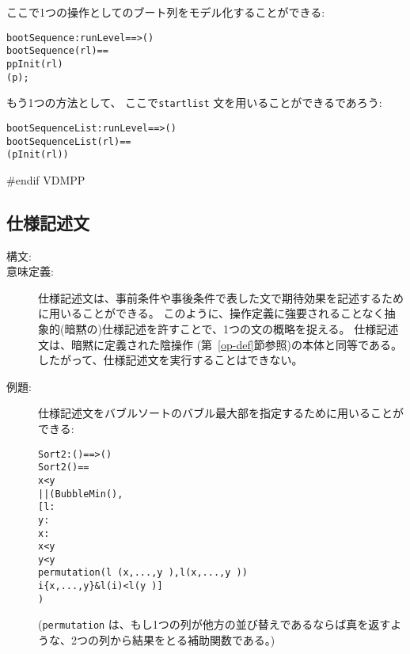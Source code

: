 \documentclass[\pformat,12pt]{jarticle}
\begin{document}
\begin{description}
ここで1つの操作としてのブート列をモデル化することができる:
\begin{alltt}
    bootSequence : runLevel ==> ()
    bootSequence(rl) ==
       p  pInit(rl) 
        (p);
\end{alltt}
もう1つの方法として、 ここで\texttt{startlist} 文を用いることができるであろう:
\begin{alltt}
    bootSequenceList : runLevel ==> ()
    bootSequenceList(rl) ==
      (pInit(rl))
\end{alltt}
\end{description}
#endif VDMPP

\subsection{仕様記述文} \label{se:specification}

\begin{description}
\item[構文:] 

\item[意味定義:] 

仕様記述文は、事前条件や事後条件で表した文で期待効果を記述するために用いることができる。
このように、操作定義に強要されることなく抽象的(暗黙の)仕様記述を許すことで、1つの文の概略を捉える。
仕様記述文は、暗黙に定義された陰操作 (第~\ref{op-def}節参照)の本体と同等である。したがって、仕様記述文を実行することはできない。

\item[例題:]  仕様記述文をバブルソートのバブル最大部を指定するために用いることができる:
  \begin{alltt}
  Sort2 : () ==> ()
  Sort2 () ==
     x < y 
      || (BubbleMin(),
          [ l : 
               y : 
               x : 
            x < y
            y < y~ 
                permutation (l~(x,...,y~),l(x,...,y~)) 
                 i  \{x,...,y\} & l(i) < l(y~)]
         )
  \end{alltt}
 (\texttt{permutation} は、もし1つの列が他方の並び替えであるならば真を返すような、2つの列から結果をとる補助関数である。)


\end{description}
\end{document}
